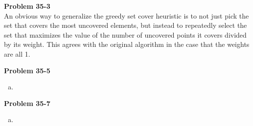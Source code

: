 \documentclass{article}
\begin{document}
\noindent\textbf{Problem 35-3}\\

An obvious way to generalize the greedy set cover heuristic is to not just pick the set that covers the most uncovered elements, but instead to repeatedly select the set that maximizes the value of the number of uncovered points it covers divided by its weight. This agrees with the original algorithm in the case that the weights are all 1.

\noindent\textbf{Problem 35-5}\\
\begin{enumerate}[a.]
\item
\end{enumerate}


\noindent\textbf{Problem 35-7}\\
\begin{enumerate}[a.]
\item
\end{enumerate}
\end{document}
